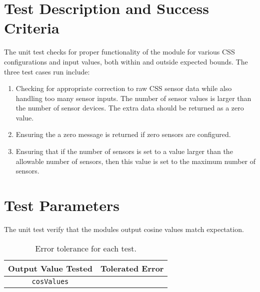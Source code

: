 
\section{Test Description and Success Criteria}
The unit test checks for proper functionality of the module for various CSS configurations and input values, both within and outside expected bounds. The three test cases run include:
\begin{enumerate}
\item Checking for appropriate correction to raw CSS sensor data while also handling too many sensor inputs. The number of sensor values is larger than the number of sensor devices.  The extra data should be returned as a zero value.
\item Ensuring the a zero message is returned if zero sensors are configured.
\item Ensuring that if the number of sensors is set to a value larger than the allowable number of sensors, then this value is set to the maximum number of sensors.
\end{enumerate}


\section{Test Parameters}

The unit test verify that the modules output cosine values match expectation.
\begin{table}[htbp]
	\caption{Error tolerance for each test.}
	\label{tab:errortol}
	\centering \fontsize{10}{10}\selectfont
	\begin{tabular}{ c | c } %
		\hline\hline
		\textbf{Output Value Tested}  & \textbf{Tolerated Error}  \\ 
		\hline
		{\tt cosValues}        & 	   \\ 
		\hline\hline
	\end{tabular}
\end{table}




